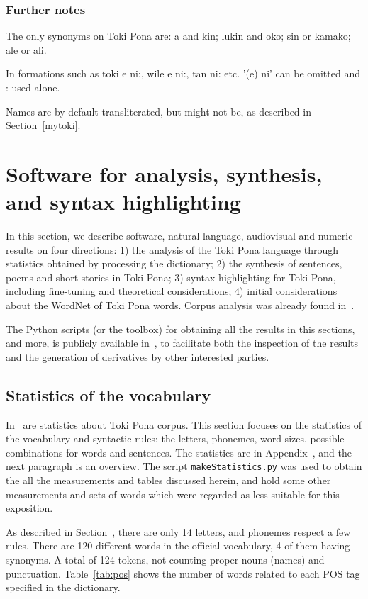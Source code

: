 \documentclass{article}
\newcommand{\tttt}[1]{\texttt{#1}}
\begin{document}
\subsubsection{Further notes}
The only synonyms on Toki Pona are:
a and kin; lukin and oko;
sin or kamako;
ale or ali.

In formations such as
toki e ni:, wile e ni:, tan ni: etc.
'(e) ni' can be omitted and : used alone.

Names are by default transliterated,
but might not be, as described in Section~\ref{mytoki}.


\section{Software for analysis, synthesis, and syntax highlighting}\label{hacks}
In this section,
we describe software, natural language, audiovisual and numeric results
on four directions:
1)
the analysis of the Toki Pona language through statistics
obtained by processing the dictionary;
2)
the synthesis of sentences, poems and short stories
in Toki Pona;
3)
syntax highlighting for Toki Pona,
including fine-tuning and theoretical
considerations;
4)
initial considerations about the WordNet of
Toki Pona words.
Corpus analysis was already found in~\cite{}.

The Python scripts (or the toolbox)
for obtaining all the results in this sections,
and more, is publicly available in~\cite{tokipona},
to facilitate both the inspection of the results and the
generation of derivatives by other interested parties.


\subsection{Statistics of the vocabulary}\label{sec:stat}
In~\cite{pije} are statistics about Toki Pona corpus.
This section focuses on the statistics of the vocabulary
and syntactic rules:
the letters, phonemes, word sizes,
possible combinations for words and sentences.
The statistics are in Appendix~\cite{listings},
and the next paragraph is an overview.
The script \tttt{makeStatistics.py}
was used to obtain the all the measurements and tables
discussed herein,
and hold some other measurements and sets of words
which were regarded as less suitable for this exposition.

As described in Section~\cite{basics},
there are only 14 letters,
and phonemes respect a few rules.
There are 120 different words in the official vocabulary,
4 of them having synonyms.
A total of 124 tokens,
not counting proper nouns (names)
and punctuation.
Table~\ref{tab:pos} shows the number of words
related to each POS tag specified in the dictionary.
\end{document}
